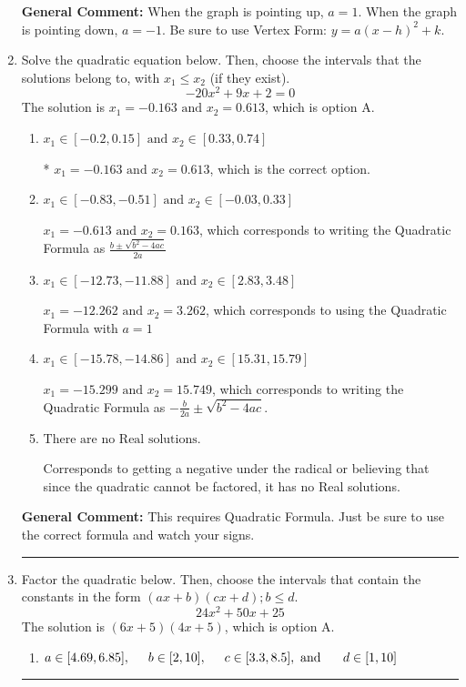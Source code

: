 \documentclass{extbook}[14pt]
\newcommand{\litem}[1]{\item #1

\rule{\textwidth}{0.4pt}}
\begin{document}
\begin{enumerate}
{\textbf{General Comment:} When the graph is pointing up, $a=1$. When the graph is pointing down, $a=-1$. Be sure to use Vertex Form: $y = a(x-h)^2+k$.
}
\litem{
Solve the quadratic equation below. Then, choose the intervals that the solutions belong to, with $x_1 \leq x_2$ (if they exist).
\[ -20x^{2} +9 x + 2 = 0 \]The solution is \( x_1 = -0.163 \text{ and } x_2 = 0.613 \), which is option A.\begin{enumerate}[label=\Alph*.]
\item \( x_1 \in [-0.2, 0.15] \text{ and } x_2 \in [0.33, 0.74] \)

* $x_1 = -0.163 \text{ and } x_2 = 0.613$, which is the correct option.
\item \( x_1 \in [-0.83, -0.51] \text{ and } x_2 \in [-0.03, 0.33] \)

 $x_1 = -0.613 \text{ and } x_2 = 0.163$, which corresponds to writing the Quadratic Formula as $\frac{b \pm \sqrt{b^2 - 4ac}}{2a}$
\item \( x_1 \in [-12.73, -11.88] \text{ and } x_2 \in [2.83, 3.48] \)

 $x_1 = -12.262 \text{ and } x_2 = 3.262$, which corresponds to using the Quadratic Formula with $a=1$
\item \( x_1 \in [-15.78, -14.86] \text{ and } x_2 \in [15.31, 15.79] \)

 $x_1 = -15.299 \text{ and } x_2 = 15.749$, which corresponds to writing the Quadratic Formula as $-\frac{b}{2a} \pm \sqrt{b^2 - 4ac}$.
\item \( \text{There are no Real solutions.} \)

Corresponds to getting a negative under the radical or believing that since the quadratic cannot be factored, it has no Real solutions.
\end{enumerate}

\textbf{General Comment:} This requires Quadratic Formula. Just be sure to use the correct formula and watch your signs.
}
\litem{
Factor the quadratic below. Then, choose the intervals that contain the constants in the form $(ax+b)(cx+d); b \leq d.$
\[ 24x^{2} +50 x + 25 \]The solution is \( (6x + 5)(4x + 5) \), which is option A.\begin{enumerate}[label=\Alph*.]
\item \( a \in [4.69, 6.85], \hspace*{5mm} b \in [2, 10], \hspace*{5mm} c \in [3.3, 8.5], \text{ and } \hspace*{5mm} d \in [1, 10] \)


\end{enumerate}}
\end{enumerate}
\end{document}

